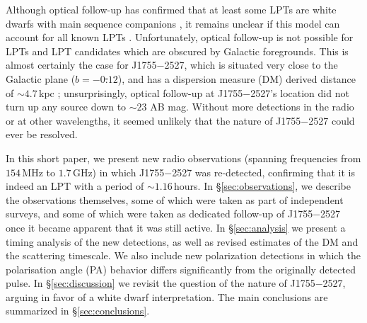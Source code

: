 \documentclass[preprint2,linenumbers]{aastex631}
\newcommand{\src}{J1755$-$2527}
\begin{document}
Although optical follow-up has confirmed that at least some LPTs are white dwarfs with main sequence companions \citep{2024arXiv240811536D,2025arXiv250103315R}, it remains unclear if this model can account for all known LPTs \citep[e.g.][]{2022ApJ...940...72R,Lee2025}.
Unfortunately, optical follow-up is not possible for LPTs and LPT candidates which are obscured by Galactic foregrounds.
This is almost certainly the case for \src{}, which is situated very close to the Galactic plane ($b = -0\overset{\circ}{.}12$), and has a dispersion measure (DM) derived distance of ${\sim}4.7\,$kpc ; unsurprisingly, optical follow-up at \src{}'s location did not turn up any source down to ${\sim}23$ AB mag.
Without more detections in the radio or at other wavelengths, it seemed unlikely that the nature of \src{} could ever be resolved.

In this short paper, we present new radio observations (spanning frequencies from $154\,$MHz to $1.7\,$GHz) in which \src{} was re-detected, confirming that it is indeed an LPT with a period of ${\sim}1.16\,$hours.
In \S\ref{sec:observations}, we describe the observations themselves, some of which were taken as part of independent surveys, and some of which were taken as dedicated follow-up of \src{} once it became apparent that it was still active.
In \S\ref{sec:analysis} we present a timing analysis of the new detections, as well as revised estimates of the DM and the scattering timescale.
We also include new polarization detections in which the polarisation angle (PA) behavior differs significantly from the originally detected pulse.
In \S\ref{sec:discussion} we revisit the question of the nature of \src{}, arguing in favor of a white dwarf interpretation.
The main conclusions are summarized in \S\ref{sec:conclusions}.
\end{document}
